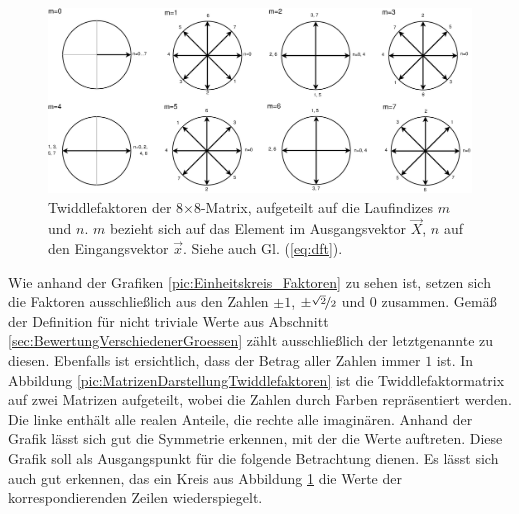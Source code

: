  


\begin{figure}[!ht]
 \centering
 \includegraphics[width=1\textwidth]{img/Twiddlefaktoren_Einheitskreis.eps}
 \caption{Twiddlefaktoren der 8$\times$8-Matrix, aufgeteilt auf die Laufindizes $m$ und $n$. $m$ bezieht sich auf das Element im Ausgangsvektor $\vec{X}$, $n$ auf den Eingangsvektor $\vec{x}$. Siehe auch Gl. (\ref{eq:dft}).}
 \label{pic:Twiddlefaktoren_Darstellung8x8}
\end{figure}

\vspace{0.5cm}
 
 Wie anhand der Grafiken \ref{pic:Einheitskreis_Faktoren} zu sehen ist, setzen sich die Faktoren ausschließlich aus den Zahlen $\pm1$, $\pm\nicefrac{\sqrt{2}}{2}$ und $0$ 
 zusammen. Gemäß der Definition für nicht triviale Werte aus Abschnitt \ref{sec:BewertungVerschiedenerGroessen} zählt ausschließlich der letztgenannte zu diesen.
 Ebenfalls ist ersichtlich, dass der Betrag aller Zahlen immer $1$ ist.
 In Abbildung \ref{pic:MatrizenDarstellungTwiddlefaktoren} ist die Twiddlefaktormatrix auf zwei Matrizen aufgeteilt, wobei die Zahlen durch Farben repräsentiert werden.
 Die linke enthält alle realen Anteile, die rechte alle imaginären. 
 Anhand der Grafik lässt sich gut die Symmetrie erkennen, mit der die Werte auftreten. Diese Grafik soll als 
 Ausgangspunkt für die folgende Betrachtung dienen.
 Es lässt sich auch gut erkennen, das ein Kreis aus Abbildung \ref{pic:Twiddlefaktoren_Darstellung8x8} die Werte der korrespondierenden Zeilen wiederspiegelt.
 
